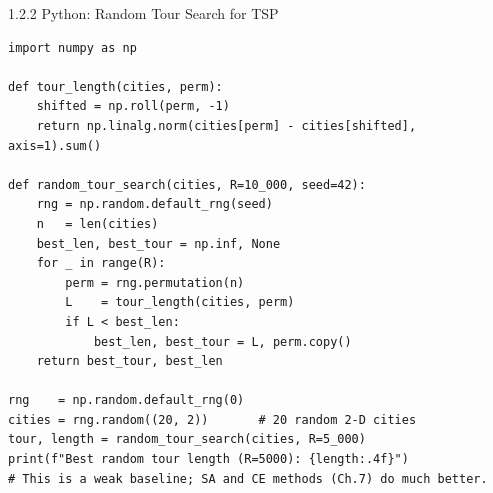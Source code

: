 \documentclass[aspectratio=169,10pt]{beamer}
\begin{document}
\begin{frame}[fragile]{1.2.2 Python: Random Tour Search for TSP}

\begin{lstlisting}[style=python, caption={Baseline random search for TSP}]
import numpy as np

def tour_length(cities, perm):
    shifted = np.roll(perm, -1)
    return np.linalg.norm(cities[perm] - cities[shifted], axis=1).sum()

def random_tour_search(cities, R=10_000, seed=42):
    rng = np.random.default_rng(seed)
    n   = len(cities)
    best_len, best_tour = np.inf, None
    for _ in range(R):
        perm = rng.permutation(n)
        L    = tour_length(cities, perm)
        if L < best_len:
            best_len, best_tour = L, perm.copy()
    return best_tour, best_len

rng    = np.random.default_rng(0)
cities = rng.random((20, 2))       # 20 random 2-D cities
tour, length = random_tour_search(cities, R=5_000)
print(f"Best random tour length (R=5000): {length:.4f}")
# This is a weak baseline; SA and CE methods (Ch.7) do much better.
\end{lstlisting}

\end{frame}
\end{document}
